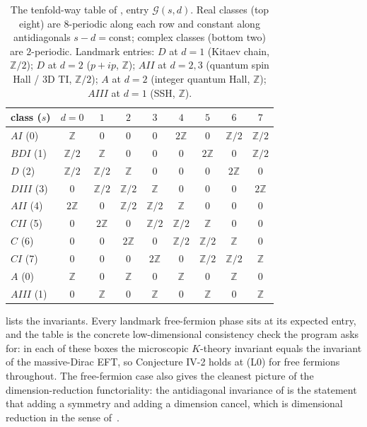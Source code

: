 \documentclass[12pt]{article}
\newcommand{\Zp}{\mathbb{Z}}
\theoremstyle{definition}
\theoremstyle{remark}
\theoremstyle{plain}
\begin{document}
\begin{table}[t]
\centering
\renewcommand{\arraystretch}{1.25}
\begin{tabular}{lcccccccc}
\toprule
class ($s$) & $d{=}0$ & $1$ & $2$ & $3$ & $4$ & $5$ & $6$ & $7$\\
\midrule
$\mathit{AI}$ (0)   & $\Zp$   & $0$    & $0$    & $0$    & $2\Zp$ & $0$    & $\Zp/2$& $\Zp/2$\\
$\mathit{BDI}$ (1)  & $\Zp/2$ & $\Zp$  & $0$    & $0$    & $0$    & $2\Zp$ & $0$    & $\Zp/2$\\
$D$ (2)             & $\Zp/2$ & $\Zp/2$& $\Zp$  & $0$    & $0$    & $0$    & $2\Zp$ & $0$\\
$\mathit{DIII}$ (3) & $0$     & $\Zp/2$& $\Zp/2$& $\Zp$  & $0$    & $0$    & $0$    & $2\Zp$\\
$\mathit{AII}$ (4)  & $2\Zp$  & $0$    & $\Zp/2$& $\Zp/2$& $\Zp$  & $0$    & $0$    & $0$\\
$\mathit{CII}$ (5)  & $0$     & $2\Zp$ & $0$    & $\Zp/2$& $\Zp/2$& $\Zp$  & $0$    & $0$\\
$C$ (6)             & $0$     & $0$    & $2\Zp$ & $0$    & $\Zp/2$& $\Zp/2$& $\Zp$  & $0$\\
$\mathit{CI}$ (7)   & $0$     & $0$    & $0$    & $2\Zp$ & $0$    & $\Zp/2$& $\Zp/2$& $\Zp$\\
\midrule
$A$ (0)             & $\Zp$   & $0$    & $\Zp$  & $0$    & $\Zp$  & $0$    & $\Zp$  & $0$\\
$\mathit{AIII}$ (1) & $0$     & $\Zp$  & $0$    & $\Zp$  & $0$    & $\Zp$  & $0$    & $\Zp$\\
\bottomrule
\end{tabular}
\caption{The tenfold-way table of , entry
$\mathcal G(s,d)$. Real classes (top eight) are $8$-periodic along each row and
constant along antidiagonals $s-d=\text{const}$; complex classes (bottom two) are
$2$-periodic. Landmark entries: $D$ at $d{=}1$ (Kitaev chain, $\Zp/2$); $D$ at
$d{=}2$ ($p{+}ip$, $\Zp$); $\mathit{AII}$ at $d{=}2,3$ (quantum spin Hall / 3D
TI, $\Zp/2$); $A$ at $d{=}2$ (integer quantum Hall, $\Zp$); $\mathit{AIII}$ at
$d{=}1$ (SSH, $\Zp$).}
\label{tab:tenfold}
\end{table}

 lists the invariants. Every landmark free-fermion phase sits
at its expected entry, and the table is the concrete low-dimensional
consistency check the program asks for: in each of these boxes the microscopic
$K$-theory invariant equals the invariant of the massive-Dirac EFT, so
Conjecture IV-2 holds at (L0) for free fermions throughout. The free-fermion case
also gives the cleanest picture of the dimension-reduction functoriality: the
antidiagonal invariance of  is the statement that adding a
symmetry and adding a dimension cancel, which is dimensional reduction in the
sense of~\cite{prodan-sb}.
\end{document}
